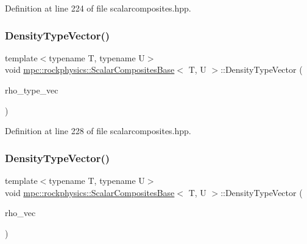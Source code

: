 Definition at line 224 of file scalarcomposites.\+hpp.

\mbox{\label{classmpc_1_1rockphysics_1_1_scalar_composites_base_af1816d0fc643a2b28f64a7bef9d883ca}} 
\subsubsection{\texorpdfstring{Density\+Type\+Vector()}{DensityTypeVector()}\hspace{0.1cm}{\footnotesize\ttfamily [2/3]}}
{\footnotesize\ttfamily template$<$typename T, typename U$>$ \\
void \mbox{\hyperlink{classmpc_1_1rockphysics_1_1_scalar_composites_base}{mpc\+::rockphysics\+::\+Scalar\+Composites\+Base}}$<$ T, U $>$\+::Density\+Type\+Vector (\begin{DoxyParamCaption}\item[{std\+::vector$<$ \mbox{\hyperlink{structmpc_1_1rockphysics_1_1_density_type}{mpc\+::rockphysics\+::\+Density\+Type}}$<$ T $>$ $>$}]{rho\+\_\+type\+\_\+vec }\end{DoxyParamCaption})\hspace{0.3cm}{\ttfamily [inline]}}



Definition at line 228 of file scalarcomposites.\+hpp.

\mbox{\label{classmpc_1_1rockphysics_1_1_scalar_composites_base_ad5f467744173a292381953a3e6837aa7}} 
\subsubsection{\texorpdfstring{Density\+Type\+Vector()}{DensityTypeVector()}\hspace{0.1cm}{\footnotesize\ttfamily [3/3]}}
{\footnotesize\ttfamily template$<$typename T, typename U$>$ \\
void \mbox{\hyperlink{classmpc_1_1rockphysics_1_1_scalar_composites_base}{mpc\+::rockphysics\+::\+Scalar\+Composites\+Base}}$<$ T, U $>$\+::Density\+Type\+Vector (\begin{DoxyParamCaption}\item[{std\+::vector$<$ T $>$ \&}]{rho\+\_\+vec }\end{DoxyParamCaption})\hspace{0.3cm}{\ttfamily [inline]}}



